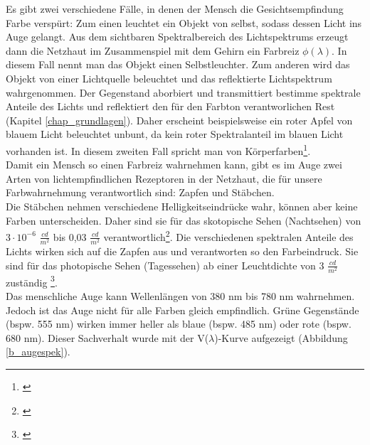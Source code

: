 Es gibt zwei verschiedene Fälle, in denen der Mensch die Gesichtsempfindung Farbe verspürt: Zum einen leuchtet ein Objekt von selbst, sodass dessen Licht ins Auge gelangt. Aus dem sichtbaren Spektralbereich des Lichtspektrums erzeugt dann die Netzhaut im Zusammenspiel mit dem Gehirn ein Farbreiz $\phi(\lambda)$. In diesem Fall nennt man das Objekt einen Selbstleuchter. Zum anderen wird das Objekt von einer Lichtquelle beleuchtet und das reflektierte Lichtspektrum wahrgenommen. Der Gegenstand aborbiert und transmittiert bestimme spektrale Anteile des Lichts und reflektiert den für den Farbton verantworlichen Rest (Kapitel \ref{chap_grundlagen}). Daher erscheint beispielsweise ein roter Apfel von blauem Licht beleuchtet unbunt, da kein roter Spektralanteil im blauen Licht vorhanden ist.
In diesem zweiten Fall spricht man von Körperfarben\footnote{\cite[103]{hentschel}}.\\     
Damit ein Mensch so einen Farbreiz wahrnehmen kann, gibt es im Auge zwei Arten von lichtempfindlichen Rezeptoren in der Netzhaut, die für unsere Farbwahrnehmung verantwortlich sind: Zapfen und Stäbchen.\\
Die Stäbchen nehmen verschiedene Helligkeitseindrücke wahr, können aber keine Farben unterscheiden. Daher sind sie für das skotopische Sehen (Nachtsehen) von $3 \cdot 10^{-6}$ $\frac{cd}{m^{2}}$ bis 0,03 $\frac{cd}{m^{2}}$ verantwortlich\footnote{\cite{doccheck sko}}.
Die verschiedenen spektralen Anteile des Lichts wirken sich auf die Zapfen aus und verantworten so den Farbeindruck. Sie sind für das photopische Sehen (Tagessehen) ab einer Leuchtdichte von 3 $\frac{cd}{m^{2}}$ zuständig \footnote{\cite{doccheck pho}}.\\
Das menschliche Auge kann Wellenlängen von 380 nm bis 780 nm wahrnehmen. Jedoch ist das Auge nicht für alle Farben gleich empfindlich. Grüne Gegenstände (bspw. 555 nm) wirken immer heller als blaue (bspw. 485 nm) oder rote (bspw. 680 nm). Dieser Sachverhalt wurde mit der V($\lambda$)-Kurve aufgezeigt (Abbildung \ref{b_augespek}).

